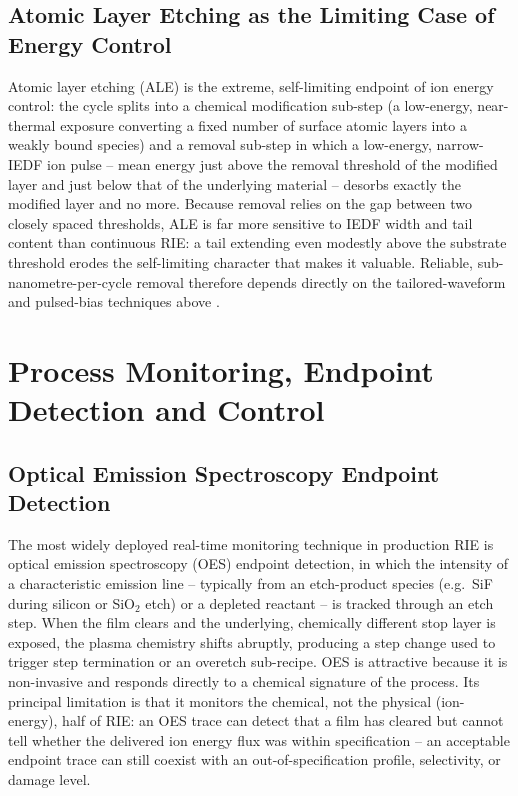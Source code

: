 \subsection{Atomic Layer Etching as the Limiting Case of Energy Control}

Atomic layer etching (ALE) is the extreme, self-limiting endpoint of ion energy control: the cycle splits into a chemical modification sub-step (a low-energy, near-thermal exposure converting a fixed number of surface atomic layers into a weakly bound species) and a removal sub-step in which a low-energy, narrow-IEDF ion pulse -- mean energy just above the removal threshold of the modified layer and just below that of the underlying material -- desorbs exactly the modified layer and no more. Because removal relies on the gap between two closely spaced thresholds, ALE is far more sensitive to IEDF width and tail content than continuous RIE: a tail extending even modestly above the substrate threshold erodes the self-limiting character that makes it valuable. Reliable, sub-nanometre-per-cycle removal therefore depends directly on the tailored-waveform and pulsed-bias techniques above \cite{ref0539,ref0541}.

\section{Process Monitoring, Endpoint Detection and Control}

\subsection{Optical Emission Spectroscopy Endpoint Detection}

The most widely deployed real-time monitoring technique in production RIE is optical emission spectroscopy (OES) endpoint detection, in which the intensity of a characteristic emission line -- typically from an etch-product species (e.g.\ SiF during silicon or SiO$_2$ etch) or a depleted reactant -- is tracked through an etch step. When the film clears and the underlying, chemically different stop layer is exposed, the plasma chemistry shifts abruptly, producing a step change used to trigger step termination or an overetch sub-recipe. OES is attractive because it is non-invasive and responds directly to a chemical signature of the process. Its principal limitation is that it monitors the chemical, not the physical (ion-energy), half of RIE: an OES trace can detect that a film has cleared but cannot tell whether the delivered ion energy flux was within specification -- an acceptable endpoint trace can still coexist with an out-of-specification profile, selectivity, or damage level.

